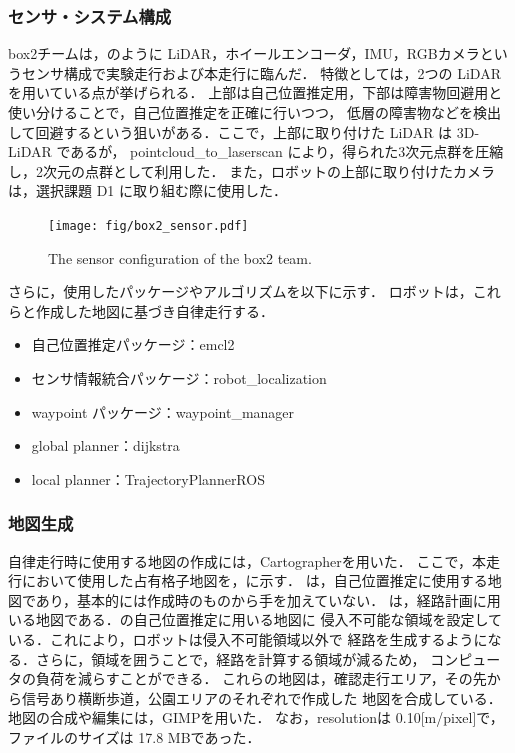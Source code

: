 \documentclass[twocolumn, 9pt]{jsproceedings}
\begin{document}
\subsubsection{センサ・システム構成}
box2チームは，のように LiDAR，ホイールエンコーダ，IMU，RGBカメラというセンサ構成で実験走行および本走行に臨んだ．
特徴としては，2つの LiDAR を用いている点が挙げられる．
上部は自己位置推定用，下部は障害物回避用と使い分けることで，自己位置推定を正確に行いつつ，
低層の障害物などを検出して回避するという狙いがある．ここで，上部に取り付けた LiDAR は 3D-LiDAR であるが，
pointcloud\_to\_laserscan\cite{pointcloud} により，得られた3次元点群を圧縮し，2次元の点群として利用した．
また，ロボットの上部に取り付けたカメラは，選択課題 D1 に取り組む際に使用した．\\

\begin{figure}[h!]
  \centering
  \texttt{[image: fig/box2\_sensor.pdf]}
  \caption{The sensor configuration of the box2 team.}
  \label{fig:box2-sensor}
\end{figure}


さらに，使用したパッケージやアルゴリズムを以下に示す．
ロボットは，これらと作成した地図に基づき自律走行する．

\begin{itemize}
  \item 自己位置推定パッケージ：emcl2\cite{emcl2}
  \item センサ情報統合パッケージ：robot\_localization\cite{robotlocalization}
  \item waypoint パッケージ：waypoint\_manager\cite{waypoint}
  \item global planner：dijkstra
  \item local planner：TrajectoryPlannerROS
\end{itemize}


\subsubsection{地図生成}
自律走行時に使用する地図の作成には，Cartographer\cite{Cartographer}を用いた．
ここで，本走行において使用した占有格子地図を，に示す．
は，自己位置推定に使用する地図であり，基本的には作成時のものから手を加えていない．
は，経路計画に用いる地図である．の自己位置推定に用いる地図に
侵入不可能な領域を設定している．これにより，ロボットは侵入不可能領域以外で
経路を生成するようになる．さらに，領域を囲うことで，経路を計算する領域が減るため，
コンピュータの負荷を減らすことができる．
これらの地図は，確認走行エリア，その先から信号あり横断歩道，公園エリアのそれぞれで作成した
地図を合成している．地図の合成や編集には，GIMP\cite{gimp}を用いた．
なお，resolutionは 0.10[m/pixel]で，ファイルのサイズは 17.8 MBであった．
\end{document}
